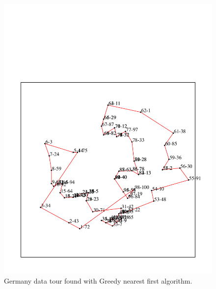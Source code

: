 

\begin{figure}[htbp]
  \centering
  \includegraphics[width=1.0\textwidth]{./media/germany_100_greedy.pdf}
  \caption{ \label{Figure_1} Germany data tour found with Greedy nearest first algorithm.}
\end{figure}

